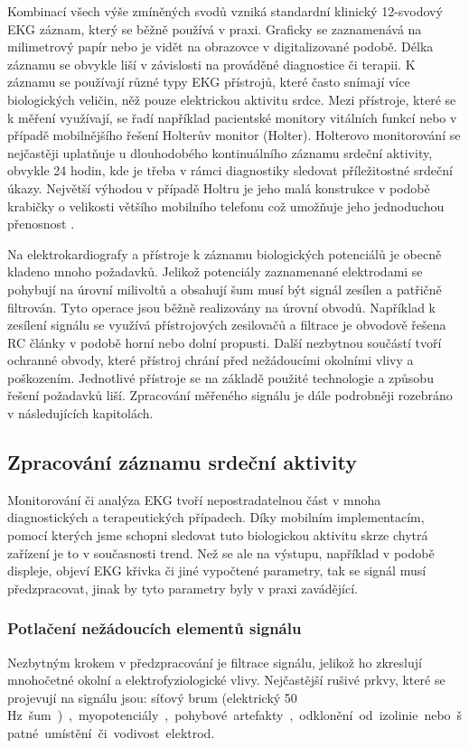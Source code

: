Kombinací všech výše zmíněných svodů vzniká standardní klinický 12-svodový EKG
záznam, který se běžně používá v praxi. Graficky se zaznamenává na milimetrový
papír nebo je vidět na obrazovce v digitalizované podobě. Délka záznamu se
obvykle liší v závislosti na prováděné diagnostice či terapii. K záznamu se
používají různé typy EKG přístrojů, které často snímají více biologických
veličin, něž pouze elektrickou aktivitu srdce. Mezi přístroje, které se k měření
využívají, se řadí například pacientské monitory vitálních funkcí nebo v případě
mobilnějšího řešení Holterův monitor (Holter). Holterovo monitorování se
nejčastěji uplatňuje u dlouhodobého kontinuálního záznamu srdeční aktivity,
obvykle 24 hodin, kde je třeba v rámci diagnostiky sledovat příležitostné
srdeční úkazy. Největší výhodou v případě Holtru je jeho malá konstrukce v
podobě krabičky o velikosti většího mobilního telefonu což umožňuje jeho
jednoduchou přenosnost \cite{}. %

Na elektrokardiografy a přístroje k záznamu biologických potenciálů je obecně
kladeno mnoho požadavků. Jelikož potenciály zaznamenané elektrodami se pohybují
na úrovní milivoltů a obsahují šum musí být signál zesílen a patřičně filtrován.
Tyto operace jsou běžně realizovány na úrovní obvodů. Například k zesílení
signálu se využívá přístrojových zesilovačů a filtrace je obvodově řešena RC
články v podobě horní nebo dolní propusti. Další nezbytnou součástí tvoří
ochranné obvody, které přístroj chrání před nežádoucími okolními vlivy a
poškozením. Jednotlivé přístroje se na základě použité technologie a způsobu
řešení požadavků liší. Zpracování měřeného signálu je dále podrobněji rozebráno
v následujících kapitolách.

\subsection{Zpracování záznamu srdeční aktivity}
Monitorování či analýza EKG tvoří nepostradatelnou část v mnoha diagnostických a
terapeutických případech. Díky mobilním implementacím, pomocí kterých jsme
schopni sledovat tuto biologickou aktivitu skrze chytrá zařízení je to v
současnosti trend. Než se ale na výstupu, například v podobě displeje, objeví
EKG křivka či jiné vypočtené parametry, tak se signál musí předzpracovat, jinak
by tyto parametry byly v praxi zavádějící.

\subsubsection{Potlačení nežádoucích elementů signálu}
Nezbytným krokem v předzpracování je filtrace signálu, jelikož ho zkreslují
mnohočetné okolní a elektrofyziologické vlivy. Nejčastější rušivé prkvy, které
se projevují na signálu jsou: síťový brum (elektrický 50 \si\Hz~šum),
myopotenciály, pohybové artefakty, odklonění od izolinie nebo špatné umístění či
vodivost elektrod. 

